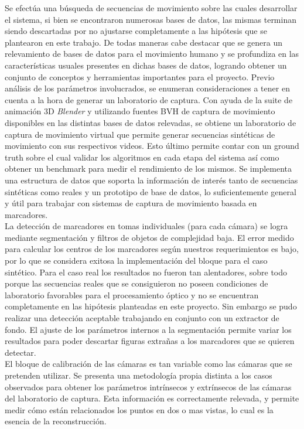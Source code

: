 Se efectúa una búsqueda de secuencias de movimiento sobre las cuales desarrollar el sistema, si bien se encontraron numerosas bases de datos, las mismas terminan siendo descartadas por no ajustarse completamente  a las hipótesis que se plantearon en este trabajo. De todas maneras cabe destacar que se genera un relevamiento de bases de datos para el movimiento humano y se profundiza en las características usuales presentes en dichas bases de datos, logrando obtener un conjunto de conceptos y herramientas importantes para el proyecto. Previo análisis de los parámetros involucrados, se enumeran consideraciones a tener en cuenta a la hora de generar un laboratorio de captura.
Con ayuda de la suite de animación 3D \emph{Blender} y utilizando fuentes BVH de captura de movimiento disponibles en las distintas bases de datos relevadas, se obtiene un laboratorio de captura de movimiento virtual que permite generar secuencias sintéticas de movimiento con sus respectivos videos. Esto último permite contar con un ground truth sobre el cual validar los algoritmos en cada etapa del sistema así como obtener un benchmark para medir el rendimiento de los mismos.
Se implementa una estructura de datos que soporta la información de interés tanto de secuencias sintéticas como reales y un prototipo de base de datos, lo suficientemente general y útil para trabajar con sistemas de captura de movimiento basada en marcadores.\\ 


La detección de marcadores en tomas individuales (para cada cámara) se logra mediante segmentación y filtros de objetos de complejidad baja. El error medido para calcular los centros de los marcadores según nuestros requerimientos es bajo, por lo que se considera exitosa la implementación del bloque para el caso sintético. Para el caso real los resultados no fueron tan alentadores, sobre todo porque las secuencias reales que se consiguieron no poseen condiciones de laboratorio favorables para el procesamiento óptico y no se encuentran completamente en las hipótesis planteadas en este proyecto. Sin embargo se pudo realizar una detección aceptable trabajando en conjunto con un extractor de fondo. El ajuste de los parámetros internos a la segmentación permite variar los resultados para poder descartar figuras extrañas a los marcadores que se quieren detectar.\\ 

El bloque de calibración de las cámaras es tan variable como las cámaras que se pretenden utilizar. Se presenta una metodología propia distinta a los casos observados para obtener los parámetros intrínsecos y extrínsecos de las cámaras del laboratorio de captura. Esta información es correctamente relevada, y permite medir cómo están relacionados los puntos en dos o mas vistas, lo cual es la esencia de la reconstrucción.\\

